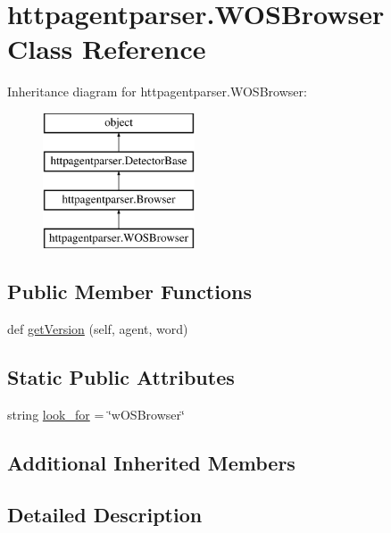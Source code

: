 \hypertarget{classhttpagentparser_1_1_w_o_s_browser}{}\section{httpagentparser.\+W\+O\+S\+Browser Class Reference}
\label{classhttpagentparser_1_1_w_o_s_browser}
Inheritance diagram for httpagentparser.\+W\+O\+S\+Browser\+:\begin{figure}[H]
\begin{center}
\leavevmode
\includegraphics[height=4.000000cm]{classhttpagentparser_1_1_w_o_s_browser}
\end{center}
\end{figure}
\subsection*{Public Member Functions}
\begin{DoxyCompactItemize}
\item 
def \hyperlink{classhttpagentparser_1_1_w_o_s_browser_a42dc078f92222cb3d7d578b623638599}{get\+Version} (self, agent, word)
\end{DoxyCompactItemize}
\subsection*{Static Public Attributes}
\begin{DoxyCompactItemize}
\item 
string \hyperlink{classhttpagentparser_1_1_w_o_s_browser_a7975440f87d3d3b3228d979f7d47267a}{look\+\_\+for} = \char`\"{}w\+O\+S\+Browser\char`\"{}
\end{DoxyCompactItemize}
\subsection*{Additional Inherited Members}


\subsection{Detailed Description}


